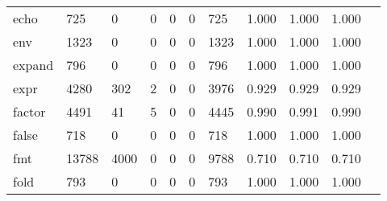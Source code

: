 \begin{longtable}{lp{1.10cm}p{1.10cm}p{1.10cm}p{1.10cm}p{1.10cm}p{1.10cm}p{1.10cm}p{1.10cm}p{1.10cm}p{1.10cm}}
echo      &                    725 &                                  0 &                                 0 &                                0 &                                 0 &                             725 &                          1.000 &                                 1.000 &                               1.000 \\
env       &                   1323 &                                  0 &                                 0 &                                0 &                                 0 &                            1323 &                          1.000 &                                 1.000 &                               1.000 \\
expand    &                    796 &                                  0 &                                 0 &                                0 &                                 0 &                             796 &                          1.000 &                                 1.000 &                               1.000 \\
expr      &                   4280 &                                302 &                                 2 &                                0 &                                 0 &                            3976 &                          0.929 &                                 0.929 &                               0.929 \\
factor    &                   4491 &                                 41 &                                 5 &                                0 &                                 0 &                            4445 &                          0.990 &                                 0.991 &                               0.990 \\
false     &                    718 &                                  0 &                                 0 &                                0 &                                 0 &                             718 &                          1.000 &                                 1.000 &                               1.000 \\
fmt       &                  13788 &                               4000 &                                 0 &                                0 &                                 0 &                            9788 &                          0.710 &                                 0.710 &                               0.710 \\
fold      &                    793 &                                  0 &                                 0 &                                0 &                                 0 &                             793 &                          1.000 &                                 1.000 &                               1.000 \\

\end{longtable}
